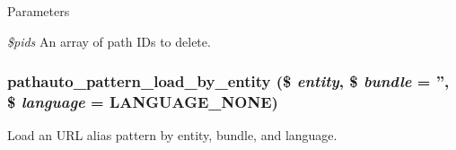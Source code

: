 \begin{DoxyParams}{Parameters}
\item[{\em \$pids}]An array of path IDs to delete. \end{DoxyParams}
\hypertarget{pathauto_8module_ae0f9acc2cba367467b5ef26d4d69e7b4}{
\subsubsection[{pathauto\_\-pattern\_\-load\_\-by\_\-entity}]{\setlength{\rightskip}{0pt plus 5cm}pathauto\_\-pattern\_\-load\_\-by\_\-entity (\$ {\em entity}, \/  \$ {\em bundle} = {\ttfamily ''}, \/  \$ {\em language} = {\ttfamily LANGUAGE\_\-NONE})}}
\label{pathauto_8module_ae0f9acc2cba367467b5ef26d4d69e7b4}
Load an URL alias pattern by entity, bundle, and language.


